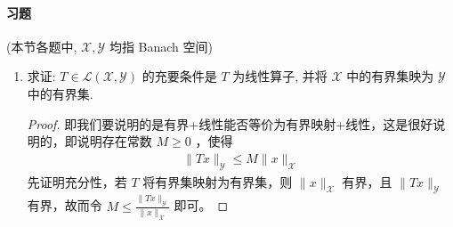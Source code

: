 	\paragraph{习题} (本节各题中, $\mathscr{X}, \mathscr{Y}$ 均指 Banach 空间)
	\begin{enumerate}[leftmargin=2cm, label=\arabic*]
		\item 求证: $T \in \mathscr{L}(\mathscr{X}, \mathscr{Y})$ 的充要条件是 $T$ 为线性算子, 并将 $\mathscr{X}$ 中的有界集映为 $\mathscr{Y}$ 中的有界集.
		\begin{proof}
			即我们要说明的是有界+线性能否等价为有界映射+线性，这是很好说明的，即说明存在常数 $M\geqslant 0$ ，使得
			\begin{align*}
				\|Tx\|_{\mathscr{Y}}\leqslant M\|x\|_{\mathscr{X}}
			\end{align*}
			先证明充分性，若 $T$ 将有界集映射为有界集，则 $\|x\|_{\mathscr{X}}$ 有界，且 $\|Tx\|_{\mathscr{Y}}$ 有界，故而令 $M\leqslant \frac{\|Tx\|_{\mathscr{Y}}}{\|x\|_{\mathscr{X}}}$ 即可。
			

\end{proof}
\end{enumerate}
